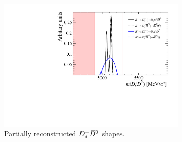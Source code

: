


\begin{figure}[!h]
    \centering
    \includegraphics[width=0.80\textwidth]{figs/B2DsPhi/DsD0_part_reco_Shapes.pdf}
    \caption{Partially reconstructed ${{D}^+_{s}}{{\kern 0.2em\overline{\kern -0.2em D}{}}{}^0}$ shapes.}
    \label{fig:B2DsPhi_DsD0_partreco}   
\end{figure}


